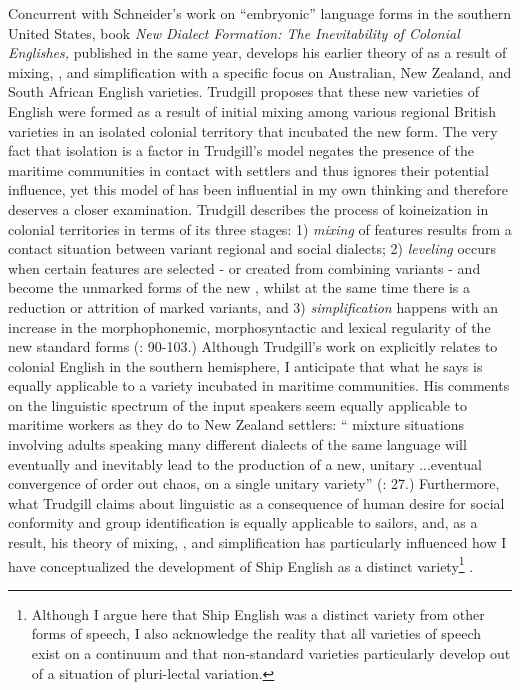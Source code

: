 Concurrent with Schneider’s work on “embryonic” language forms in the southern United States,  book \textit{New Dialect Formation: The Inevitability of Colonial Englishes,} published in the same year, develops his earlier theory of  as a result of mixing, , and simplification with a specific focus on Australian, New Zealand, and South African English varieties. Trudgill proposes that these new varieties of English were formed as a result of initial mixing among various regional British varieties in an isolated colonial territory that incubated the new form. The very fact that isolation is a factor in Trudgill’s model negates the presence of the maritime communities in contact with settlers and thus ignores their potential influence, yet this model of  has been influential in my own thinking and therefore deserves a closer examination. Trudgill describes the process of koineization in colonial territories in terms of its three stages: 1) \textit{mixing} of features results from a contact situation between variant regional and social dialects; 2) \textit{leveling} occurs when certain features are selected - or created from combining variants - and become the unmarked forms of the new , whilst at the same time there is a reduction or attrition of marked variants, and 3) \textit{simplification} happens with an increase in the morphophonemic, morphosyntactic and lexical regularity of the new standard forms (\citealt{Trudgill1986}: 90-103.)  Although Trudgill’s work on  explicitly relates to colonial English in the southern hemisphere, I anticipate that what he says is equally applicable to a variety incubated in maritime communities. His comments on the linguistic spectrum of the input speakers seem equally applicable to maritime workers as they do to New Zealand settlers: “ mixture situations involving adults speaking many different dialects of the same language will eventually and inevitably lead to the production of a new, unitary ...eventual convergence of order out chaos, on a single unitary variety” (\citealt{Trudgill2004}: 27.) Furthermore, what Trudgill claims about linguistic  as a consequence of human desire for social conformity and group identification is equally applicable to sailors, and, as a result, his theory of mixing, , and simplification has particularly influenced how I have conceptualized the development of Ship English as a distinct variety\footnote{Although I argue here that Ship English was a distinct variety from other forms of speech, I also acknowledge the reality that all varieties of speech exist on a continuum and that non-standard varieties particularly develop out of a situation of pluri-lectal variation.} .

